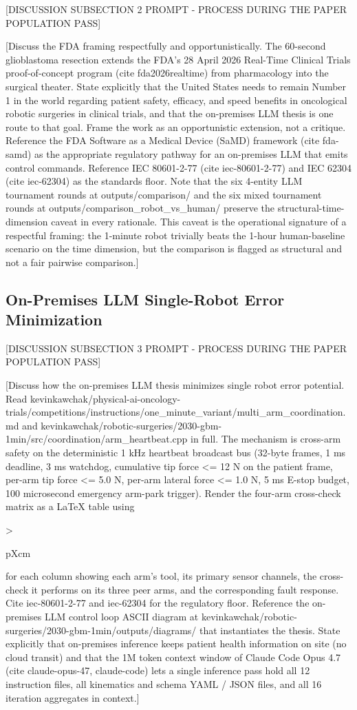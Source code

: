 [DISCUSSION SUBSECTION 2 PROMPT - PROCESS DURING THE PAPER POPULATION PASS]

[Discuss the FDA framing respectfully and opportunistically. The
60-second glioblastoma resection extends the FDA's 28 April 2026
Real-Time Clinical Trials proof-of-concept program (cite
fda2026realtime) from pharmacology into the surgical theater. State
explicitly that the United States needs to remain Number 1 in the
world regarding patient safety, efficacy, and speed benefits in
oncological robotic surgeries in clinical trials, and that the
on-premises LLM thesis is one route to that goal. Frame the work as
an opportunistic extension, not a critique. Reference the FDA
Software as a Medical Device (SaMD) framework (cite fda-samd) as
the appropriate regulatory pathway for an on-premises LLM that emits
control commands. Reference IEC 80601-2-77 (cite iec-80601-2-77) and
IEC 62304 (cite iec-62304) as the standards floor. Note that the
six 4-entity LLM tournament rounds at outputs/comparison/ and the
six mixed tournament rounds at outputs/comparison_robot_vs_human/
preserve the structural-time-dimension caveat in every rationale.
This caveat is the operational signature of a respectful framing: the
1-minute robot trivially beats the 1-hour human-baseline scenario on
the time dimension, but the comparison is flagged as structural and
not a fair pairwise comparison.]

\subsection{On-Premises LLM Single-Robot Error Minimization}
\label{sec:discussion-llm}

[DISCUSSION SUBSECTION 3 PROMPT - PROCESS DURING THE PAPER POPULATION PASS]

[Discuss how the on-premises LLM thesis minimizes single robot error
potential. Read
kevinkawchak/physical-ai-oncology-trials/competitions/instructions/one_minute_variant/multi_arm_coordination.md
and
kevinkawchak/robotic-surgeries/2030-gbm-1min/src/coordination/arm_heartbeat.cpp
in full. The mechanism is cross-arm safety on the deterministic 1 kHz
heartbeat broadcast bus (32-byte frames, 1 ms deadline, 3 ms
watchdog, cumulative tip force <= 12 N on the patient frame,
per-arm tip force <= 5.0 N, per-arm lateral force <= 1.0 N, 5 ms
E-stop budget, 100 microsecond emergency arm-park trigger). Render
the four-arm cross-check matrix as a LaTeX table using
{>{\raggedright\arraybackslash}p{Xcm}} for each column showing each
arm's tool, its primary sensor channels, the cross-check it performs
on its three peer arms, and the corresponding fault response. Cite
iec-80601-2-77 and iec-62304 for the regulatory floor. Reference the
on-premises LLM control loop ASCII diagram at
kevinkawchak/robotic-surgeries/2030-gbm-1min/outputs/diagrams/ that
instantiates the thesis. State explicitly that on-premises inference
keeps patient health information on site (no cloud transit) and that
the 1M token context window of Claude Code Opus 4.7 (cite
claude-opus-47, claude-code) lets a single inference pass hold all
12 instruction files, all kinematics and schema YAML / JSON files,
and all 16 iteration aggregates in context.]

